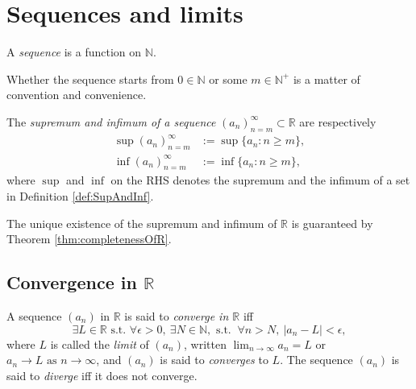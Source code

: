 
\section{Sequences and limits}
\label{sec:sequences}

\begin{defn}
  A \emph{sequence} is a function on $\mathbb{N}$.
\end{defn}

\begin{rem}
  Whether the sequence starts from $0\in\mathbb{N}$
  or some $m\in \mathbb{N}^+$
  is a matter of convention and convenience.
\end{rem}

\begin{defn}
  The \emph{supremum and infimum of a sequence}
  $(a_n)_{n=m}^{\infty}\subset \mathbb{R}$ are respectively 
  \begin{align}
    \label{eq:supSequence}
    \sup(a_n)_{n=m}^{\infty}
    &:= \sup \{a_n: n\ge m\},
    \\
    \label{eq:infSequence}
    \inf(a_n)_{n=m}^{\infty}
    &:= \inf \{a_n: n\ge m\},
  \end{align}
  where $\sup$ and $\inf$ on the RHS
  denotes the supremum and the infimum of a set
  in Definition \ref{def:SupAndInf}. 
\end{defn}

\begin{rem}
  The unique existence of the supremum and infimum of $\mathbb{R}$
  is guaranteed by Theorem \ref{thm:completenessOfR}.
\end{rem}


\subsection{Convergence in $\mathbb{R}$}
\label{sec:convergenceOfSequenceInR}

\begin{defn}
  \label{def:limitOfSequence}
  A sequence $(a_n)$ in $\mathbb{R}$
  is said to \emph{converge in $\mathbb{R}$} iff
  \begin{equation}
    \label{eq:limitOfSequence}
    \exists L\in \mathbb{R} \text{ s.t. }  
    \forall \epsilon>0,\ \exists N\in \mathbb{N}, \text{ s.t. }\ 
    \forall n>N, \ |a_n-L| < \epsilon, 
  \end{equation}
  where $L$ is called the \emph{limit} of $(a_n)$, 
  written $\lim_{n\rightarrow \infty} a_n = L$
  or 
  \mbox{$a_n\rightarrow L \text{ as } n\rightarrow\infty$}, 
  and $(a_n)$ is said to \emph{converges} to $L$.
  The sequence $(a_n)$ is said to \emph{diverge}
  iff it does not converge.
\end{defn}

